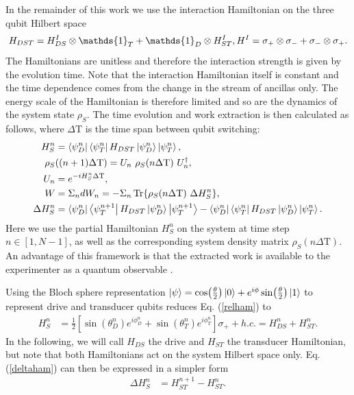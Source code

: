 In the remainder of this work we use the interaction Hamiltonian on the three qubit Hilbert space
\begin{equation*}
H_{DST} = H^{I}_{DS} \otimes \mathds{1}_T + \mathds{1}_D \otimes H^{I}_{ST}, \\
H^{I} = \sigma_{+} \otimes \sigma_{-} + \sigma_{-} \otimes \sigma_{+}.
\end{equation*}
The Hamiltonians are unitless and therefore the interaction strength is given by the evolution time.
Note that the interaction Hamiltonian itself is constant and the time dependence comes from the change in the stream of ancillas only.
The energy scale of the Hamiltonian is therefore limited and so are the dynamics of the system state $\rho_S$.
The time evolution and work extraction is then calculated as follows, where $\Delta \mathrm{T}$ is the time span between qubit switching:
\begin{align}
H_S^n &= \bra{\psi_D^n}\bra{\psi_T^n} H_{DST} \ket{\psi_D^n} \ket{\psi_T^n}, \label{relham}\\
\rho_S &((n+1) \Delta \mathrm{T}) = U_n \ \rho_S(n \Delta \mathrm{T}) \ U^{\dagger}_n, \nonumber \\
U_n &= e^{-iH_S^n \Delta \mathrm{T}}, \nonumber \\ 
W &= \Sigma_n dW_n = - \Sigma_n \Tr{\rho_S(n \Delta \mathrm{T}) \ \Delta H_S^n}, \label{dw} \\
\Delta H_S^n &= \bra{\psi_D^n}\bra{\psi_T^{n+1}} H_{DST} \ket{\psi_D^n} \ket{\psi_T^{n+1}} - \bra{\psi_D^n}\bra{\psi_T^n} H_{DST} \ket{\psi_D^n} \ket{\psi_T^n}. \label{deltaham}
\end{align}
Here we use the partial Hamiltonian $H_S^n$ on the system at time step $n \in [1, N - 1]$, as well as the corresponding system density matrix $\rho_S(n \Delta \mathrm{T})$.
An advantage of this framework is that the extracted work is available to the experimenter as a quantum observable \cite{beyer2020}.

Using the Bloch sphere representation $\ket{\psi} = \cos(\frac{\theta}{2}) \ket{0} + e^{i \phi} \sin(\frac{\theta}{2})\ket{1}$ to represent drive and transducer qubits reduces Eq. (\ref{relham}) to
\begin{align}
H_S^n &= \frac{1}{2} \left[\sin(\theta_D^n) e^{i\phi_D^n} + \sin(\theta_T^n) e^{i\phi_T^n}\right] \sigma_{+} + h.c. =  H_{DS}^n + H_{ST}^n. \nonumber
\end{align}
In the following, we will call $H_{DS}$ the drive and $H_{ST}$ the transducer Hamiltonian, but note that both Hamiltonians act on the system Hilbert space only.
Eq. (\ref{deltaham}) can then be expressed in a simpler form
\begin{align}
\Delta H_S^n &= H_{ST}^{n+1} - H_{ST}^n. \label{simpledeltaham}
\end{align}